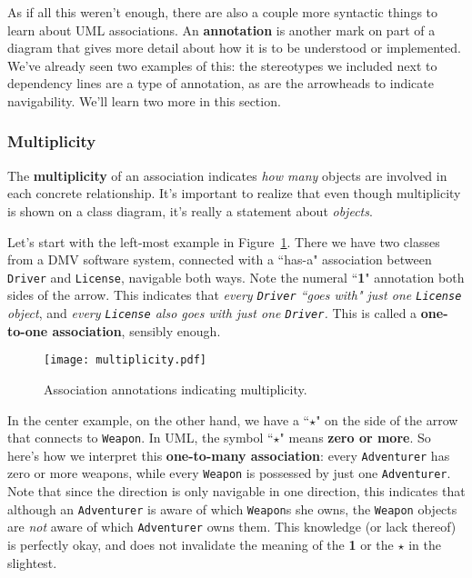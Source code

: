 As if all this weren't enough, there are also a couple more syntactic things
to learn about UML associations. An \textbf{annotation} is another mark on
part of a diagram that gives more detail about how it is to be understood or
implemented. We've already seen two examples of this: the stereotypes we
included next to dependency lines are a type of annotation, as are the
arrowheads to indicate navigability. We'll learn two more in this section.

\subsubsection{Multiplicity}

The \textbf{multiplicity} of an association indicates \textit{how many}
objects are involved in each concrete relationship. It's important to realize
that even though multiplicity is shown on a class diagram, it's really a
statement about \textit{objects}.

Let's start with the left-most example in Figure~\ref{fig:multiplicity}. There
we have two classes from a DMV software system, connected with a ``has-a"
association between \texttt{Driver} and \texttt{License}, navigable both ways.
Note the numeral ``\textbf{1}" annotation both sides of the arrow. This
indicates that \textit{every \texttt{Driver} ``goes with" just one
\texttt{License} object}, and \textit{every \texttt{License} also goes with
just one \texttt{Driver}.} This is called a \textbf{one-to-one association},
sensibly enough.

\begin{figure}[ht]
\centering
\texttt{[image: multiplicity.pdf]}   %
\caption{Association annotations indicating multiplicity.}
\label{fig:multiplicity}
\end{figure}

In the center example, on the other hand, we have a ``$\star$" on the side of
the arrow that connects to \texttt{Weapon}. In UML, the symbol ``$\star$"
means \textbf{zero or more}. So here's how we interpret this
\textbf{one-to-many association}: every \texttt{Adventurer} has zero or more
weapons, while every \texttt{Weapon} is possessed by just one
\texttt{Adventurer}. Note that since the direction is only navigable in one
direction, this indicates that although an \texttt{Adventurer} is aware of
which \texttt{Weapon}s she owns, the \texttt{Weapon} objects are \textit{not}
aware of which \texttt{Adventurer} owns them. This knowledge (or lack thereof)
is perfectly okay, and does not invalidate the meaning of the \textbf{1} or
the $\star$ in the slightest.

